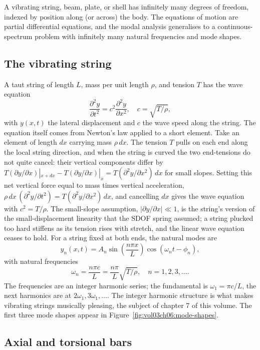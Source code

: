 A vibrating string, beam, plate, or shell has infinitely many
degrees of freedom, indexed by position along (or across) the body.
The equations of motion are partial differential equations, and the
modal analysis generalises to a continuous-spectrum problem with
infinitely many natural frequencies and mode shapes.

\subsection{The vibrating string}

A taut string of length $L$, mass per unit length $\rho$, and
tension $T$ has the wave equation
\[
\frac{\partial^2 y}{\partial t^2} = c^2 \frac{\partial^2 y}{\partial
x^2}, \quad c = \sqrt{T/\rho},
\]
with $y(x, t)$ the lateral displacement and $c$ the wave speed
along the string. The equation itself comes from Newton's law applied
to a short element. Take an element of length $dx$ carrying mass
$\rho\,dx$. The tension $T$ pulls on each end along the local string
direction, and when the string is curved the two end-tensions do not
quite cancel: their vertical components differ by $T(\partial y/\partial
x)|_{x+dx} - T(\partial y/\partial x)|_x = T(\partial^2 y/\partial x^2)
\,dx$ for small slopes. Setting this net vertical force equal to mass
times vertical acceleration, $\rho\,dx\,(\partial^2 y/\partial t^2) =
T(\partial^2 y/\partial x^2)\,dx$, and cancelling $dx$ gives the wave
equation with $c^2 = T/\rho$. The small-slope assumption, $|\partial
y/\partial x| \ll 1$, is the string's version of the small-displacement
linearity that the SDOF spring assumed; a string plucked too hard
stiffens as its tension rises with stretch, and the linear wave equation
ceases to hold. For a string fixed at both ends, the natural
modes are
\[
y_n(x, t) = A_n \sin\left(\frac{n\pi x}{L}\right) \cos(\omega_n t -
\phi_n),
\]
with natural frequencies
\[
\omega_n = \frac{n\pi c}{L} = \frac{n\pi}{L}\sqrt{T/\rho}, \quad n =
1, 2, 3, \ldots.
\]
The frequencies are an integer harmonic series; the fundamental is
$\omega_1 = \pi c/L$, the next harmonics are at $2\omega_1, 3\omega_1,
\ldots$. The integer harmonic structure is what makes vibrating
strings musically pleasing, the subject of chapter 7 of this volume.
The first three mode shapes appear in
Figure~\ref{fig:vol03ch06:mode-shapes}.



\subsection{Axial and torsional bars}

